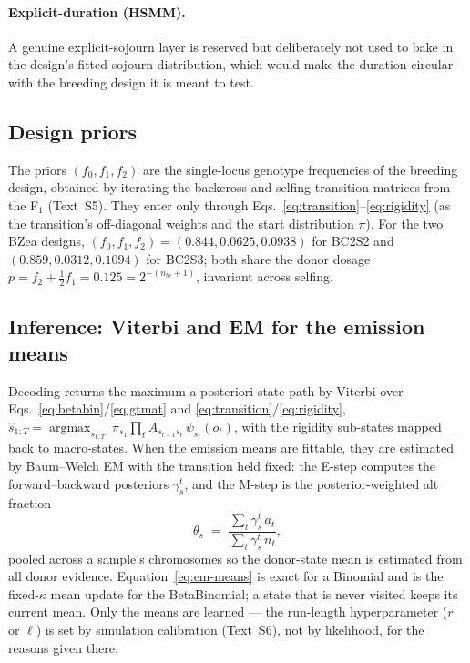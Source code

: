 \documentclass[11pt]{article}
\DeclareMathOperator*{\argmax}{argmax}
\begin{document}
\paragraph{Explicit-duration (HSMM).} A genuine explicit-sojourn layer is reserved
but deliberately not used to bake in the design's fitted sojourn distribution, which
would make the duration circular with the breeding design it is meant to test.

\subsection{Design priors}
\label{sec:engine-priors}

The priors $(f_0,f_1,f_2)$ are the single-locus genotype frequencies of the
breeding design, obtained by iterating the backcross and selfing transition
matrices from the F$_1$ (Text~S5). They enter only through
Eqs.~\eqref{eq:transition}--\eqref{eq:rigidity} (as the transition's off-diagonal
weights and the start distribution $\pi$). For the two BZea designs,
$(f_0,f_1,f_2)=(0.844,0.0625,0.0938)$ for BC2S2 and $(0.859,0.0312,0.1094)$ for
BC2S3; both share the donor dosage $p=f_2+\tfrac12 f_1=0.125=2^{-(n_{bc}+1)}$,
invariant across selfing.

\subsection{Inference: Viterbi and EM for the emission means}
\label{sec:engine-inference}

Decoding returns the maximum-a-posteriori state path by Viterbi over
Eqs.~\eqref{eq:betabin}/\eqref{eq:gtmat} and
\eqref{eq:transition}/\eqref{eq:rigidity},
$\hat s_{1:T}=\argmax_{s_{1:T}}\ \pi_{s_1}\prod_{t}A_{s_{t-1}s_t}\,\psi_{s_t}(o_t)$,
with the rigidity sub-states mapped back to macro-states. When the emission means
are fittable, they are estimated by Baum--Welch EM with the transition held fixed:
the E-step computes the forward--backward posteriors $\gamma_s^t$, and the M-step is
the posterior-weighted alt fraction
\begin{equation}
\theta_s \;=\; \frac{\sum_t \gamma_s^t\,a_t}{\sum_t \gamma_s^t\,n_t},
\label{eq:em-means}
\end{equation}
pooled across a sample's chromosomes so the donor-state mean is estimated from all
donor evidence. Equation~\eqref{eq:em-means} is exact for a Binomial and is the
fixed-$\kappa$ mean update for the BetaBinomial; a state that is never visited keeps
its current mean. Only the means are learned --- the run-length hyperparameter ($r$ or
$\ell$) is set by simulation calibration (Text~S6), not by likelihood, for the reasons
given there.
\end{document}
